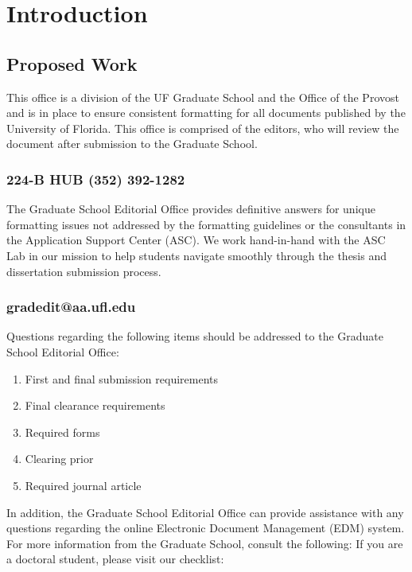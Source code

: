 \chapter{Introduction}%








\section{Proposed Work}%
This office is a division of the UF Graduate School and the Office of the Provost and is in place to ensure consistent formatting for all documents published by the University of Florida. This office is comprised of the editors, who will review the document after submission to the Graduate School. \cite{Bailey}
\subsection{224-B HUB (352) 392-1282}
The Graduate School Editorial Office provides definitive answers for unique formatting issues not addressed by the formatting guidelines or the consultants in the Application Support Center (ASC). We work hand-in-hand with the ASC Lab in our mission to help students navigate smoothly through the thesis and dissertation submission process. 
\subsection{gradedit@aa.ufl.edu}
Questions regarding the following items should be addressed to the Graduate School Editorial Office: \cite{ahal:2005,dici:1989b,datt:1995}

   \begin{enumerate}
   \item First and final submission requirements \vspace{-10 pt}
   \item Final clearance requirements \vspace{-10 pt}
   \item Required forms \vspace{-10 pt}
   \item Clearing prior \vspace{-10 pt}
   \item Required journal article
   \end{enumerate}

In addition, the Graduate School Editorial Office can provide assistance with any questions regarding the online Electronic Document Management (EDM) system. For more information from the Graduate School, consult the following: If you are a doctoral student, please visit our checklist:

